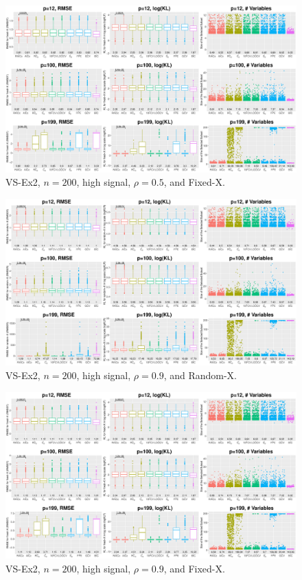 \begin{figure}[!ht]
\centering
\includegraphics[width=\textwidth]{figures/supplement/fixedx_VS-Ex2_n200_hsnr_rho05.eps}
\caption{VS-Ex2, $n=200$, high signal, $\rho=0.5$, and Fixed-X.}
\end{figure}
\clearpage
\begin{figure}[!ht]
\centering
\includegraphics[width=\textwidth]{figures/supplement/randomx_VS-Ex2_n200_hsnr_rho09.eps}
\caption{VS-Ex2, $n=200$, high signal, $\rho=0.9$, and Random-X.}
\end{figure}
\begin{figure}[!ht]
\centering
\includegraphics[width=\textwidth]{figures/supplement/fixedx_VS-Ex2_n200_hsnr_rho09.eps}
\caption{VS-Ex2, $n=200$, high signal, $\rho=0.9$, and Fixed-X.}
\end{figure}
